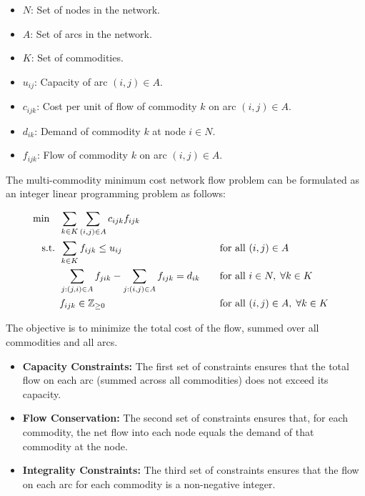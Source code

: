 \begin{itemize}
\item \( N \): Set of nodes in the network.
\item \( A \): Set of arcs in the network.
\item \( K \): Set of commodities.
\end{itemize}
%
\begin{itemize}
\item \( u_{ij} \): Capacity of arc \( (i, j) \in A \).
\item \( c_{ijk} \): Cost per unit of flow of commodity \( k \) on arc \( (i, j) \in A \).
\item \( d_{ik} \): Demand of commodity \( k \) at node \( i \in N \).
\end{itemize}
%
\begin{itemize}
\item \( f_{ijk} \): Flow of commodity \( k \) on arc \( (i, j) \in A \).
\end{itemize}
%
The multi-commodity minimum cost network flow problem can be formulated as an integer linear programming problem as follows:

\begin{align*}
\min \quad & \sum_{k \in K} \sum_{(i, j) \in A} c_{ijk} f_{ijk} \\
\text{ s.t. }        & \sum_{k \in K} f_{ijk} \leq u_{ij} &&\quad \text{for all } (i, j) \in A \\
& \sum_{j:(j, i) \in A} f_{jik} - \sum_{j:(i, j) \in A} f_{ijk} = d_{ik} &&\quad \text{for all } i \in N, \; \forall k \in K \\
& f_{ijk} \in \mathbb{Z}_{\geq 0} &&\quad \text{for all } (i, j) \in A, \; \forall k \in K
\end{align*}

The objective is to minimize the total cost of the flow, summed over all commodities and all arcs.

\begin{itemize}
\item \textbf{Capacity Constraints:} The first set of constraints ensures that the total flow on each arc (summed across all commodities) does not exceed its capacity.
\item \textbf{Flow Conservation:} The second set of constraints ensures that, for each commodity, the net flow into each node equals the demand of that commodity at the node.
\item \textbf{Integrality Constraints:} The third set of constraints ensures that the flow on each arc for each commodity is a non-negative integer.
\end{itemize}


